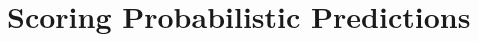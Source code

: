 \documentclass[t]{beamer}
\begin{document}

\section{Scoring Probabilistic Predictions}
\end{document}
